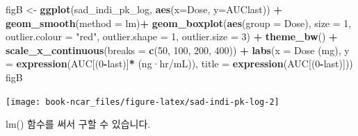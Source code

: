 \documentclass[
  10pt,
]{krantz}
\makeatletter
\newenvironment{Shaded}{\begin{snugshade}}{\end{snugshade}}
\newcommand{\DataTypeTok}[1]{\textcolor[rgb]{0.13,0.29,0.53}{#1}}
\newcommand{\DecValTok}[1]{\textcolor[rgb]{0.00,0.00,0.81}{#1}}
\newcommand{\KeywordTok}[1]{\textcolor[rgb]{0.13,0.29,0.53}{\textbf{#1}}}
\newcommand{\NormalTok}[1]{#1}
\newcommand{\OperatorTok}[1]{\textcolor[rgb]{0.81,0.36,0.00}{\textbf{#1}}}
\newcommand{\StringTok}[1]{\textcolor[rgb]{0.31,0.60,0.02}{#1}}
\newenvironment{kframe}{%
\medskip{}
\setlength{\fboxsep}{.8em}
 \def\at@end@of@kframe{}%
 \ifinner\ifhmode%
  \def\at@end@of@kframe{\end{minipage}}%
  \begin{minipage}{\columnwidth}%
 \fi\fi%
 \def\FrameCommand##1{\hskip\@totalleftmargin \hskip-\fboxsep
 \colorbox{shadecolor}{##1}\hskip-\fboxsep
     \hskip-\linewidth \hskip-\@totalleftmargin \hskip\columnwidth}%
 \MakeFramed {\advance\hsize-\width
   \@totalleftmargin\z@ \linewidth\hsize
   \@setminipage}}%
 {\par\unskip\endMakeFramed%
 \at@end@of@kframe}
\renewenvironment{Shaded}{\begin{kframe}}{\end{kframe}}
\makeatother
\begin{document}
\begin{Shaded}
\begin{Highlighting}[]
\NormalTok{figB \textless{}{-}}\StringTok{ }\KeywordTok{ggplot}\NormalTok{(sad\_indi\_pk\_log, }\KeywordTok{aes}\NormalTok{(}\DataTypeTok{x=}\NormalTok{Dose, }\DataTypeTok{y=}\NormalTok{AUClast)) }\OperatorTok{+}
\StringTok{  }\KeywordTok{geom\_smooth}\NormalTok{(}\DataTypeTok{method =} \StringTok{\textquotesingle{}lm\textquotesingle{}}\NormalTok{)}\OperatorTok{+}
\StringTok{  }\KeywordTok{geom\_boxplot}\NormalTok{(}\KeywordTok{aes}\NormalTok{(}\DataTypeTok{group =}\NormalTok{ Dose), }
               \DataTypeTok{size =} \DecValTok{1}\NormalTok{, }
               \DataTypeTok{outlier.colour =} \StringTok{"red"}\NormalTok{, }
               \DataTypeTok{outlier.shape =} \DecValTok{1}\NormalTok{, }
               \DataTypeTok{outlier.size =} \DecValTok{3}\NormalTok{) }\OperatorTok{+}
\StringTok{  }\KeywordTok{theme\_bw}\NormalTok{() }\OperatorTok{+}
\StringTok{  }\KeywordTok{scale\_x\_continuous}\NormalTok{(}\DataTypeTok{breaks =} \KeywordTok{c}\NormalTok{(}\DecValTok{50}\NormalTok{, }\DecValTok{100}\NormalTok{, }\DecValTok{200}\NormalTok{, }\DecValTok{400}\NormalTok{)) }\OperatorTok{+}
\StringTok{  }\KeywordTok{labs}\NormalTok{(}\DataTypeTok{x =} \StringTok{\textquotesingle{}Dose (mg)\textquotesingle{}}\NormalTok{, }\DataTypeTok{y =} \KeywordTok{expression}\NormalTok{(}\StringTok{\textquotesingle{}AUC\textquotesingle{}}\NormalTok{[(}\DecValTok{0}\OperatorTok{{-}}\NormalTok{last)]}\OperatorTok{*}\StringTok{\textquotesingle{} (ng·hr/mL)\textquotesingle{}}\NormalTok{),}
       \DataTypeTok{title =} \KeywordTok{expression}\NormalTok{(}\StringTok{\textquotesingle{}AUC\textquotesingle{}}\NormalTok{[(}\DecValTok{0}\OperatorTok{{-}}\NormalTok{last)]))}
\NormalTok{figB}
\end{Highlighting}
\end{Shaded}

\texttt{[image: book-ncar\_files/figure-latex/sad-indi-pk-log-2]}

lm() 함수를 써서 구할 수 있습니다.
\end{document}

